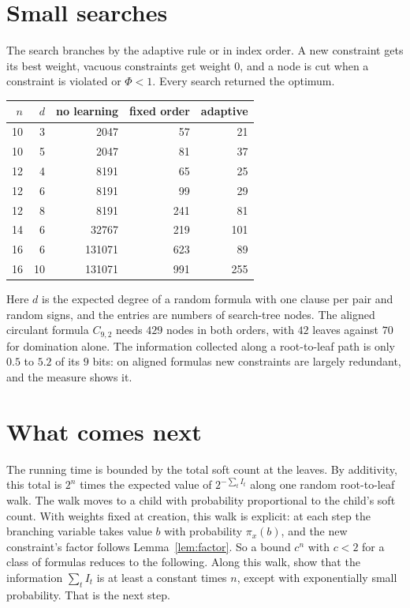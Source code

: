 \documentclass[11pt,a4paper]{article}
\theoremstyle{definition}
\begin{document}
\section{Small searches}

The search branches by the adaptive rule or in index order. A new constraint
gets its best weight, vacuous constraints get weight $0$, and a node is cut
when a constraint is violated or $\Phi<1$. Every search returned the optimum.

\begin{center}
\begin{tabular}{rrrrr}
\toprule
$n$ & $d$ & no learning & fixed order & adaptive\\
\midrule
10 & 3 & 2047 & 57 & 21\\
10 & 5 & 2047 & 81 & 37\\
12 & 4 & 8191 & 65 & 25\\
12 & 6 & 8191 & 99 & 29\\
12 & 8 & 8191 & 241 & 81\\
14 & 6 & 32767 & 219 & 101\\
16 & 6 & 131071 & 623 & 89\\
16 & 10 & 131071 & 991 & 255\\
\bottomrule
\end{tabular}
\end{center}
Here $d$ is the expected degree of a random formula with one clause per pair
and random signs, and the entries are numbers of search-tree nodes. The
aligned circulant formula $C_{9,2}$ needs $429$ nodes in both orders, with
$42$ leaves against $70$ for domination alone. The information collected along
a root-to-leaf path is only $0.5$ to $5.2$ of its $9$ bits: on aligned
formulas new constraints are largely redundant, and the measure shows it.

\section{What comes next}

The running time is bounded by the total soft count at the leaves. By
additivity, this total is $2^n$ times the expected value of $2^{-\sum_tI_t}$
along one random root-to-leaf walk. The walk moves to a child with
probability proportional to the child's soft count. With weights fixed at
creation, this walk is explicit: at each step the branching variable takes
value $b$ with probability $\pi_x(b)$, and the new constraint's factor follows
Lemma~\ref{lem:factor}. So a bound $c^n$ with $c<2$ for a class of formulas
reduces to the following. Along this walk, show that the information
$\sum_tI_t$ is at least a constant times $n$, except with exponentially small
probability. That is the next step.
\end{document}
